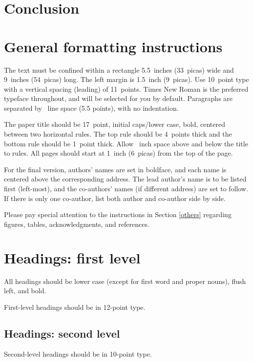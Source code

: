 \documentclass{article}
\begin{document}
\section{Conclusion}




\section{General formatting instructions}
\label{gen_inst}

The text must be confined within a rectangle 5.5~inches (33~picas)
wide and 9~inches (54~picas) long. The left margin is 1.5~inch
(9~picas).  Use 10~point type with a vertical spacing (leading) of
11~points.  Times New Roman is the preferred typeface throughout, and
will be selected for you by default.  Paragraphs are separated by
~line space (5.5 points), with no indentation.

The paper title should be 17~point, initial caps/lower case, bold,
centered between two horizontal rules. The top rule should be 4~points
thick and the bottom rule should be 1~point thick. Allow
~inch space above and below the title to rules. All
pages should start at 1~inch (6~picas) from the top of the page.

For the final version, authors' names are set in boldface, and each
name is centered above the corresponding address. The lead author's
name is to be listed first (left-most), and the co-authors' names (if
different address) are set to follow. If there is only one co-author,
list both author and co-author side by side.

Please pay special attention to the instructions in Section \ref{others}
regarding figures, tables, acknowledgments, and references.

\section{Headings: first level}
\label{headings}

All headings should be lower case (except for first word and proper
nouns), flush left, and bold.

First-level headings should be in 12-point type.

\subsection{Headings: second level}

Second-level headings should be in 10-point type.
\end{document}
